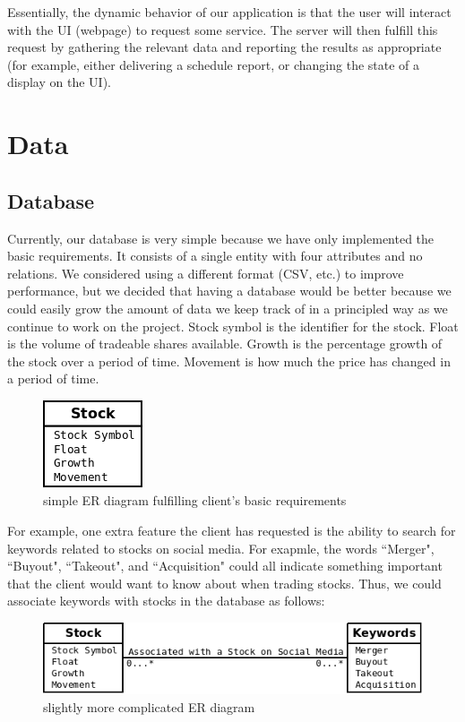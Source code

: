 \documentclass[12pt,a4paper]{article}
\begin{document}
Essentially, the dynamic behavior of our application is that the user will interact with the UI (webpage) to request some service. The server will then fulfill this request by gathering the relevant data and reporting the results as appropriate (for example, either delivering a schedule report, or changing the state of a display on the  UI).

\section{Data}

\subsection{Database}

Currently, our database is very simple because we have only implemented the basic requirements. It consists of a single entity with four attributes and no relations. We considered using a different format (CSV, etc.) to improve performance, but we decided that having a database would be better because we could easily grow the amount of data we keep track of in a principled way as we continue to work on the project. Stock symbol is the identifier for the stock. Float is the volume of tradeable shares available. Growth is the percentage growth of the stock over a period of time. Movement is how much the price has changed in a period of time.

\begin{figure}[h!]
  \centering
  \includegraphics[scale=0.5]{simple_ER.png}
  \caption{simple ER diagram fulfilling client's basic requirements}
\end{figure}

For example, one extra feature the client has requested is the ability to search for keywords related to stocks on social media. For exapmle, the words ``Merger", ``Buyout", ``Takeout", and ``Acquisition" could all indicate something important that the client would want to know about when trading stocks. Thus, we could associate keywords with stocks in the database as follows:
\\
\begin{figure}[h!]
  \centering
      \includegraphics[scale=0.7]{More_ER.png}
  \caption{slightly more complicated ER diagram}
\end{figure}
\end{document}
